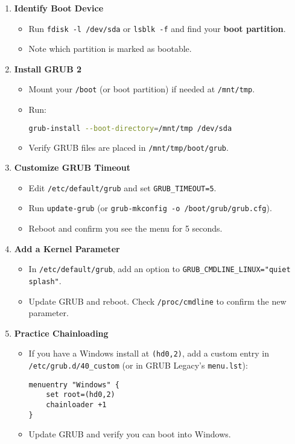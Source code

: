 \documentclass[a4paper]{report}
\begin{document}
\begin{enumerate}
    \item \textbf{Identify Boot Device}
    \begin{itemize}
        \item Run \texttt{fdisk -l /dev/sda} or \texttt{lsblk -f} and find your \textbf{boot partition}.
        \item Note which partition is marked as bootable.
    \end{itemize}

    \item \textbf{Install GRUB 2}
    \begin{itemize}
        \item Mount your \texttt{/boot} (or boot partition) if needed at \texttt{/mnt/tmp}.
        \item Run:
        \begin{lstlisting}[language=bash]
grub-install --boot-directory=/mnt/tmp /dev/sda
        \end{lstlisting}
        \item Verify GRUB files are placed in \texttt{/mnt/tmp/boot/grub}.
    \end{itemize}

    \item \textbf{Customize GRUB Timeout}
    \begin{itemize}
        \item Edit \texttt{/etc/default/grub} and set \texttt{GRUB\_TIMEOUT=5}.
        \item Run \texttt{update-grub} (or \texttt{grub-mkconfig -o /boot/grub/grub.cfg}).
        \item Reboot and confirm you see the menu for 5 seconds.
    \end{itemize}

    \item \textbf{Add a Kernel Parameter}
    \begin{itemize}
        \item In \texttt{/etc/default/grub}, add an option to \texttt{GRUB\_CMDLINE\_LINUX="quiet splash"}.
        \item Update GRUB and reboot. Check \texttt{/proc/cmdline} to confirm the new parameter.
    \end{itemize}

    \item \textbf{Practice Chainloading}
    \begin{itemize}
        \item If you have a Windows install at \texttt{(hd0,2)}, add a custom entry in \texttt{/etc/grub.d/40\_custom} (or in GRUB Legacy’s \texttt{menu.lst}):
        \begin{lstlisting}
menuentry "Windows" {
    set root=(hd0,2)
    chainloader +1
}
        \end{lstlisting}
        \item Update GRUB and verify you can boot into Windows.
    \end{itemize}


\end{enumerate}
\end{document}
